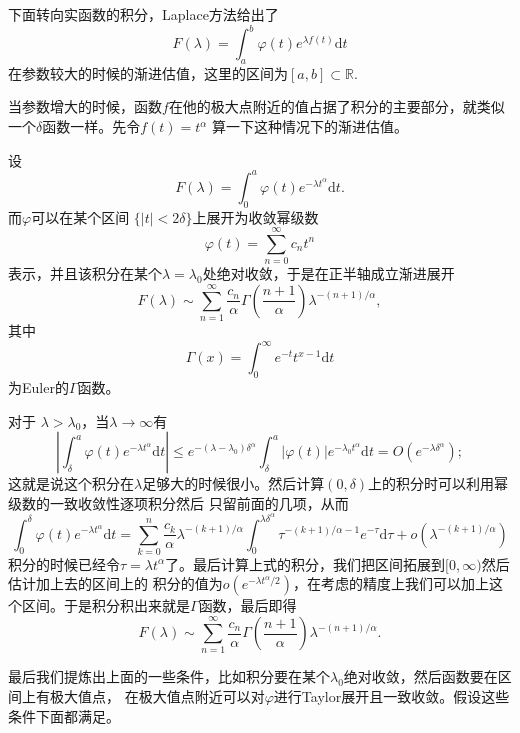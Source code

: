 下面转向实函数的积分，Laplace方法给出了
\[
F(\lambda)=\int_a^b \varphi(t) e^{\lambda f(t)} \mathrm{d}t
\]
在参数较大的时候的渐进估值，这里的区间为$[a,b]\subset \mathbb{R}$.

当参数增大的时候，函数$f$在他的极大点附近的值占据了积分的主要部分，就类似一个$\delta$函数一样。先令$f(t)=t^\alpha$
算一下这种情况下的渐进估值。

\begin{thm}
设\[
F(\lambda)=\int_0^a \varphi(t) e^{-\lambda t^\alpha} \mathrm{d}t.
\]
而$\varphi$可以在某个区间 $\{|t|<2\delta\}$上展开为收敛幂级数
\[
\varphi(t)=\sum_{n=0}^\infty c_nt^n
\]
表示，并且该积分在某个$\lambda=\lambda_0$处绝对收敛，于是在正半轴成立渐进展开
\[
F(\lambda) \sim \sum_{n=1}^\infty \frac{c_n}{\alpha}\Gamma\left(\frac{n+1}{\alpha}\right)\lambda^{-(n+1)/\alpha } ,
\]
其中\[\Gamma(x)=\int_{0}^\infty e^{-t}t^{x-1}\mathrm{d}t\]为Euler的$\Gamma$函数。
\end{thm}
对于 $\lambda >\lambda_ 0$，当$\lambda \to \infty$有
\[
\left|\int_\delta^a \varphi(t) e^{-\lambda t^\alpha} \mathrm{d}t\right|\leq e^{- (\lambda-\lambda_0)\delta^\alpha}
\int_\delta^a|\varphi(t)|e^{-\lambda_0t^\alpha}\mathrm{d}t=O(e^{- \lambda\delta^\alpha});
\]
这就是说这个积分在$\lambda$足够大的时候很小。然后计算$(0,\delta)$上的积分时可以利用幂级数的一致收敛性逐项积分然后
只留前面的几项，从而
\[
\int^\delta_0 \varphi(t) e^{-\lambda t^\alpha} \mathrm{d}t=\sum_{k=0}^n\frac{c_k}{\alpha}\lambda^{-(k+1)/\alpha}
\int_0^{\lambda\delta^\alpha}\tau^{-(k+1)/\alpha-1}
e^{-\tau}\mathrm{d}\tau+o(\lambda^{-(k+1)/\alpha})
\]
积分的时候已经令$\tau=\lambda t^\alpha$了。最后计算上式的积分，我们把区间拓展到$[0,\infty)$然后估计加上去的区间上的
积分的值为$o(e^{-\lambda t^\alpha/2})$，在考虑的精度上我们可以加上这个区间。于是积分积出来就是$\Gamma$函数，最后即得
\[
F(\lambda) \sim \sum_{n=1}^\infty \frac{c_n}{\alpha}\Gamma\left(\frac{n+1}{\alpha}\right)\lambda^{-(n+1)/\alpha } .
\]

最后我们提炼出上面的一些条件，比如积分要在某个$\lambda_0$绝对收敛，然后函数要在区间上有极大值点，
在极大值点附近可以对$\varphi$进行Taylor展开且一致收敛。假设这些条件下面都满足。


